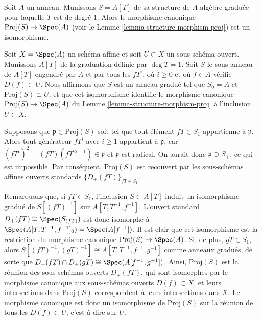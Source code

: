 \begin{example}
\label{example-trivial-proj}
Soit $A$ un anneau. Munissons $S = A[T]$ de sa structure de $A$-algèbre
graduée pour laquelle $T$ est de degré
$1$. Alors le morphisme canonique
$\text{Proj}(S) \to \Spec(A)$ (voir le
Lemme \ref{lemma-structure-morphism-proj}) est un isomorphisme.
\end{example}

\begin{example}
\label{example-open-subset-proj}
Soit $X = \Spec(A)$ un schéma affine et soit $U \subset X$ un sous-schéma
ouvert. Munissons $A[T]$ de la graduation définie par $\deg T = 1$.
Soit $S$ le sous-anneau de $A[T]$ engendré par $A$ et par tous les $fT^i$,
où $i \ge 0$ et où $f \in A$ vérifie $D(f) \subset U$. Nous affirmons que
$S$ est un anneau gradué tel que $S_0 = A$ et
$\text{Proj}(S) \cong U$, et que cet isomorphisme identifie le morphisme
canonique $\text{Proj}(S) \to \Spec(A)$ du
Lemme \ref{lemma-structure-morphism-proj} à l'inclusion $U \subset X$.

\medskip\noindent
Supposons que $\mathfrak p \in \text{Proj}(S)$ soit tel que tout élément
$fT \in S_1$ appartienne à $\mathfrak p$. Alors tout générateur $fT^i$ avec $i \ge 1$ appartient à $\mathfrak p$, car
$(fT^i)^2 = (fT)(fT^{2i-1}) \in \mathfrak p$ et $\mathfrak p$ est radical.
On aurait donc $\mathfrak p \supset S_+$, ce qui est impossible.
Par conséquent, $\text{Proj}(S)$ est recouvert par les sous-schémas
affines ouverts standards $\{D_+(fT)\}_{fT \in S_1}$.

\medskip\noindent
Remarquons que, si $fT \in S_1$, l'inclusion $S \subset A[T]$ induit un
isomorphisme gradué de $S[(fT)^{-1}]$ sur $A[T, T^{-1}, f^{-1}]$. L'ouvert standard
$D_+(fT) \cong \Spec(S_{(fT)})$ est donc isomorphe à
$\Spec(A[T, T^{-1}, f^{-1}]_0) = \Spec(A[f^{-1}])$.
Il est clair que cet isomorphisme est la restriction du morphisme canonique
$\text{Proj}(S) \to \Spec(A)$. Si, de plus, $gT \in S_1$, alors
$S[(fT)^{-1}, (gT)^{-1}] \cong A[T, T^{-1}, f^{-1}, g^{-1}]$
comme anneaux gradués, de sorte que $D_+(fT) \cap D_+(gT) \cong \Spec(A[f^{-1}, g^{-1}])$.
Ainsi, $\text{Proj}(S)$ est la réunion des sous-schémas ouverts $D_+(fT)$,
qui sont isomorphes par le morphisme canonique aux sous-schémas ouverts
$D(f) \subset X$, et leurs intersections dans $\text{Proj}(S)$ correspondent
à leurs intersections dans $X$. Le morphisme canonique est donc un
isomorphisme de $\text{Proj}(S)$ sur la réunion de tous les
$D(f) \subset U$, c'est-à-dire sur $U$.
\end{example}





















